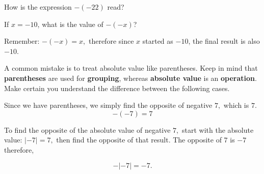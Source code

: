 \documentclass{ximera}[font=12pt]
\begin{document}
\begin{problem}
How is the expression $-(-22)$ read?

\begin{multipleChoice}
\end{multipleChoice}

\end{problem}


\begin{problem}
If $x = -10$, what is the value of $-(-x)$?

\begin{multipleChoice}
\end{multipleChoice}

\begin{feedback}
Remember: $-(-x) = x,$ therefore since $x$ started as $-10$, the final result is also $-10$.
\end{feedback}
\end{problem}


\begin{warning}

A common mistake is to treat absolute value like parentheses. Keep in mind that \textbf{parentheses} are 
used for \textbf{grouping}, whereas \textbf{absolute value} is an \textbf{operation}.  Make certain you 
understand the difference between the following cases.  

\begin{description}[style=nextline, leftmargin=0pt]  %
    \item[Double Negative with Parentheses]

Since we have parentheses, we simply find the opposite of negative $7,$ which is $7.$
\[ -(-7) = 7 \]

\item[Double Negative with Absolute Value]

To find the opposite of the absolute value of negative $7,$ start with the absolute value: $|-7| = 7,$ 
then find the opposite of that result.  The opposite of $7$ is $-7$ therefore,

\[ -|-7| = -7. \]

\end{description}

\end{warning}
\end{document}

